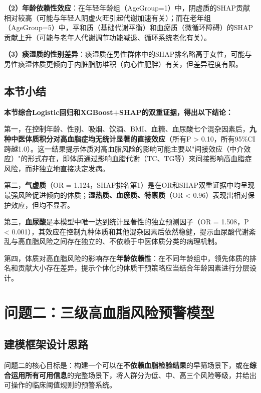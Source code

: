 \documentclass[12pt,a4paper]{ctexart}
\begin{document}
\textbf{（2）年龄依赖性效应}：在年轻年龄组（AgeGroup=1）中，阴虚质的SHAP贡献相对较高（可能与年轻人阴虚火旺引起代谢加速有关）；而在老年组（AgeGroup=5）中，平和质（基础代谢平衡）和血瘀质（微循环障碍）的SHAP贡献上升（可能与老年人代谢调节功能减退、循环系统老化有关）。

\textbf{（3）痰湿质的性别差异}：痰湿质在男性群体中的SHAP排名略高于女性，可能与男性痰湿体质更倾向于内脏脂肪堆积（向心性肥胖）有关，但差异程度有限。

\subsection{本节小结}

\textbf{本节综合Logistic回归和XGBoost+SHAP的双重证据，得出以下结论：}

第一，在控制年龄、性别、吸烟、饮酒、BMI、血糖、血尿酸七个混杂因素后，\textbf{九种中医体质积分对高血脂症均无统计显著的直接效应}（所有P > 0.10，所有95\%CI跨越1.0）。这一结果提示体质对高血脂风险的影响可能主要以"间接效应（中介效应）"的形式存在，即体质通过影响血脂代谢（TC、TG等）来间接影响高血脂症风险，而非独立地直接决定发病。

第二，\textbf{气虚质}（OR = 1.124，SHAP排名第1）是在OR和SHAP双重证据中均呈现最强风险促进倾向的体质；\textbf{湿热质、血瘀质、特禀质}（OR < 0.96）表现出相对保护效应，但均不显著。

第三，\textbf{血尿酸}是本模型中唯一达到统计显著性的独立预测因子（OR = 1.508，P < 0.001），其效应在控制九种体质和其他混杂因素后依然稳健，提示血尿酸代谢紊乱与高血脂风险之间存在独立的、不依赖于中医体质分类的病理机制。

第四，体质对高血脂风险的影响存在\textbf{年龄依赖性}：在不同年龄组中，领先体质的排名和贡献大小存在差异，提示个体化的体质干预策略应当结合年龄因素进行分层设计。


\section{问题二：三级高血脂风险预警模型}

\subsection{建模框架设计思路}

问题二的核心目标是：构建一个可以在\textbf{不依赖血脂检验结果}的早筛场景下，或在\textbf{综合运用所有可用信息}的完整场景下，将人群分为低、中、高三个风险等级，并给出可操作的临床阈值规则的预警系统。
\end{document}
